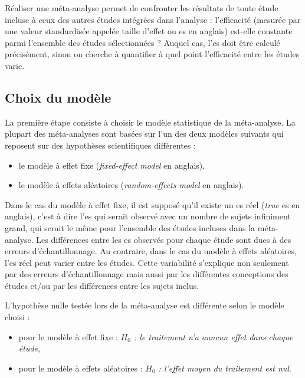 Réaliser une méta-analyse permet de confronter les résultats de toute étude incluse à ceux des autres études intégrées dans l'analyse : l'efficacité (mesurée par 
une valeur standardisée appelée taille d'effet ou \gls{es} en anglais) est-elle constante parmi l'ensemble des études sélectionnées ? 
Auquel cas, l'\gls{es} doit être calculé précisément, sinon on cherche à quantifier à quel point l'efficacité entre les études varie.

\subsection{Choix du modèle}

La première étape consiste à choisir le modèle statistique de la méta-analyse. La plupart des méta-analyses sont basées sur l'un des deux modèles 
suivants qui reposent sur des hypothèses scientifiques différentes \citep{Borenstein2009} :
\renewcommand{\labelitemi}{$\bullet$}
\begin{itemize}
\item le modèle à effet fixe (\textit{fixed-effect model} en anglais),
\item le modèle à effets aléatoires (\textit{random-effects model} en anglais).
\end{itemize}

Dans le cas du modèle à effet fixe, il est supposé qu'il existe un \gls{es} réel (\textit{true} \gls{es} en anglais), c'est à dire l'\gls{es} qui serait
observé avec un nombre de sujets infiniment grand, qui serait le même pour l'ensemble des études incluses dans la méta-analyse. Les différences entre
les \gls{es} observés pour chaque étude sont dues à des erreurs d'échantillonnage. Au contraire, dans le cas du modèle à effets aléatoires, 
l'\gls{es} réel peut varier entre les études. Cette variabilité s'explique non seulement par des erreurs d'échantillonnage mais aussi par 
les différentes conceptions des études et/ou par les différences entre les sujets inclus.

L'hypothèse nulle testée lors de la méta-analyse est différente selon le modèle choisi :
\begin{itemize}
\item pour le modèle à effet fixe : 
\textit{$H_{0}$ : le traitement n'a auncun effet dans chaque étude},
\item pour le modèle à effets aléatoires : 
\textit{$H_{0}$ : l'effet moyen du traitement est nul}.
\end{itemize}

